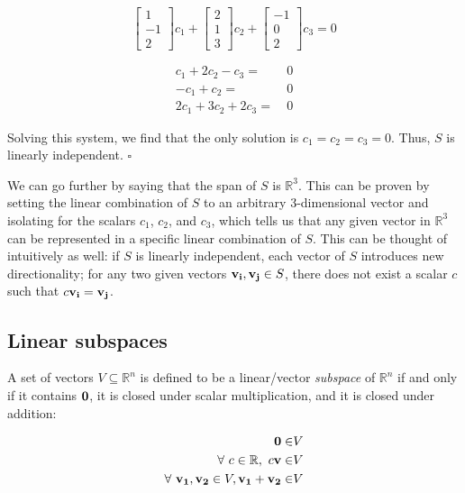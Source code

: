 \documentclass[../main.tex]{subfiles}
\begin{document}
\begin{solution}
	\begin{equation*}
		\begin{bmatrix} 1 \\ -1 \\ 2 \end{bmatrix}c_1
		+ \begin{bmatrix} 2 \\ 1 \\ 3 \end{bmatrix}c_2
		+ \begin{bmatrix} -1 \\ 0 \\ 2 \end{bmatrix}c_3 = 0
	\end{equation*}

	\begin{equation*}
		\begin{split}
			c_1+2c_2-c_3=   & \ 0 \\
			-c_1+c_2=       & \ 0 \\
			2c_1+3c_2+2c_3= & \ 0
		\end{split}
	\end{equation*}

	Solving this system, we find that the only solution is
	$c_1=c_2=c_3=0$. Thus, $S$ is linearly independent. $\square$

	We can go further by saying that the span of $S$ is $\mathbb{R}^3$. This
	can be proven by setting the linear combination of $S$ to an
	arbitrary 3-dimensional vector and isolating for the scalars $c_1$, $c_2$, and $c_3$,
	which tells us that any given vector in $\mathbb{R}^3$ can be represented
	in a specific linear combination of $S$. This can be thought of intuitively as well:
	if $S$ is linearly independent, each vector of $S$ introduces
	new directionality; for any two given vectors
	$\mathbf{v_i}, \mathbf{v_j} \in S$, there does not exist a scalar $c$
	such that $c\mathbf{v_i}=\mathbf{v_j}$.
\end{solution}

\subsection{Linear subspaces}

\begin{definition}
	A set of vectors $V \subseteq \mathbb{R}^n$ is defined to be a linear/vector \textit{subspace}
	of $\mathbb{R}^n$ if and only if it contains $\mathbf{0}$,
	it is closed under scalar multiplication, and it is closed under addition:

	\begin{align*}
		\mathbf{0} \in                                                       & V \\
		\forall\ c \in \mathbb{R},\ c\mathbf{v} \in                          & V \\
		\forall\ \mathbf{v_1}, \mathbf{v_2} \in V, \mathbf{v_1} + \mathbf{v_2} \in & V
	\end{align*}
\end{definition}
\end{document}
